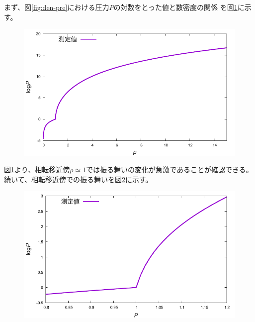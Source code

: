 \documentclass[titlepage]{jsreport}
\begin{document}
{{{まず、図\ref{fig:den-pre}における圧力$P$の対数をとった値と数密度の関係
を図\ref{fig:logarithm_den-pre}に示す。

\begin{figure}[htbp]
    \begin{center}
        \includegraphics[width=13.5cm]{fig/logarithm_den-pre.pdf}
    \end{center}
    \caption{}
    \label{fig:logarithm_den-pre}
\end{figure}

\newpage
図\ref{fig:logarithm_den-pre}より、相転移近傍${\rho}\simeq{1}$では振る舞いの変化が急激であることが確認できる。
続いて、相転移近傍での振る舞いを図\ref{fig:middleden-logarithm_den-pre}に示す。

\begin{figure}[htbp]
    \begin{center}
        \includegraphics[width=13.5cm]{fig/middleden-logarithm_den-pre.pdf}
    \end{center}
    \caption{}
    \label{fig:middleden-logarithm_den-pre}
\end{figure}

}}}
\end{document}
